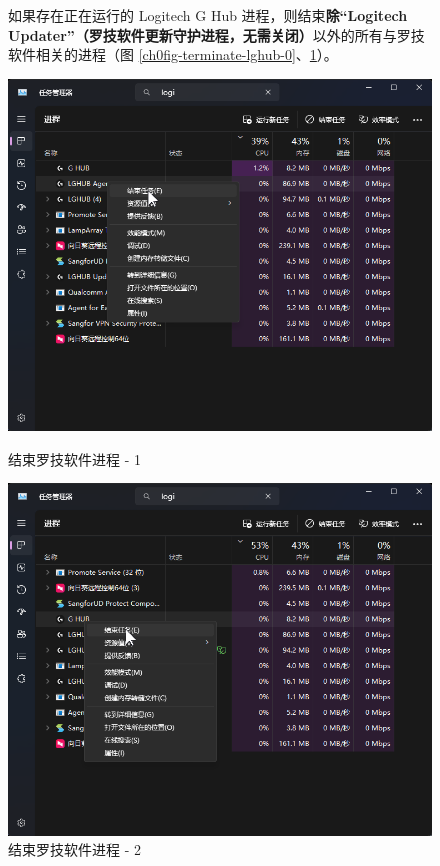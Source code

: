 \begin{figure}[H]
    \Centering
    \parbox[l]{\textwidth}{如果存在正在运行的 Logitech G Hub 进程，则结束\textbf{\color{red}除“Logitech Updater”（罗技软件更新守护进程，无需关闭）}以外的所有与罗技软件相关的进程（图 \ref{ch0fig-terminate-lghub-0}、\ref{ch0fig-terminate-lghub-1}）。}
    \includegraphics[width=\textwidth]{assets/intro/terminate_lghub_00.png}
    \caption{结束罗技软件进程 - 1}
    \label{ch0fig-terminate-lghub-0}
    \includegraphics[width=\textwidth]{assets/intro/terminate_lghub_01.png}
    \caption{结束罗技软件进程 - 2}
    \label{ch0fig-terminate-lghub-1}
\end{figure}

